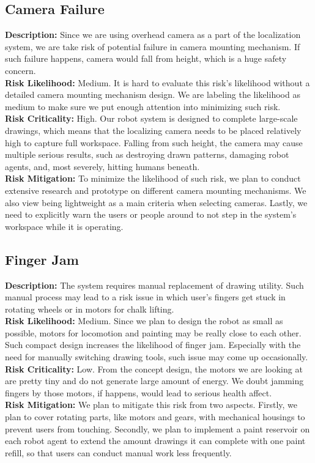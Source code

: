 \subsection{Camera Failure}
\textbf{Description:} Since we are using overhead camera as a part of the localization system, we are take risk of potential failure in camera mounting mechanism. If such failure happens, camera would fall from height, which is a huge safety concern.\\
\textbf{Risk Likelihood:} Medium. It is hard to evaluate this risk’s likelihood without a detailed camera mounting mechanism design. We are labeling the likelihood as medium to make sure we put enough attention into minimizing such risk.\\
\textbf{Risk Criticality:} High. Our robot system is designed to complete large-scale drawings, which means that the localizing camera needs to be placed relatively high to capture full workspace. Falling from such height, the camera may cause multiple serious results, such as destroying drawn patterns, damaging robot agents, and, most severely, hitting humans beneath. \\
\textbf{Risk Mitigation:} To minimize the likelihood of such risk, we plan to conduct extensive research and prototype on different camera mounting mechanisms. We also view being lightweight as a main criteria when selecting cameras. Lastly, we need to explicitly warn the users or people around to not step in the system’s workspace while it is operating.\\

\subsection{Finger Jam}
\textbf{Description:} The system requires manual replacement of drawing utility. Such manual process may lead to a risk issue in which user’s fingers get stuck in rotating wheels or in motors for chalk lifting. \\
\textbf{Risk Likelihood:} Medium. Since we plan to design the robot as small as possible, motors for locomotion and painting may be really close to each other. Such compact design increases the likelihood of finger jam. Especially with the need for manually switching drawing tools, such issue may come up occasionally. \\
\textbf{Risk Criticality:} Low. From the concept design, the motors we are looking at are pretty tiny and do not generate large amount of energy. We doubt jamming fingers by those motors, if happens, would lead to serious health affect.\\
\textbf{Risk Mitigation:} We plan to mitigate this risk from two aspects. Firstly, we plan to cover rotating parts, like motors and gears, with mechanical housings to prevent users from touching. Secondly, we plan to implement a paint reservoir on each robot agent to extend the amount drawings it can complete with one paint refill, so that users can conduct manual work less frequently.\\
